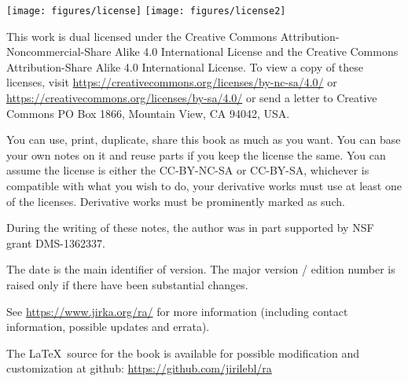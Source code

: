 \documentclass[12pt]{book}
\theoremstyle{plain}
\theoremstyle{remark}
\theoremstyle{definition}
\theoremstyle{exercise}
\theoremstyle{example}
\begin{document}
%



\bigskip

\noindent
\texttt{[image: figures/license]}
\quad
\texttt{[image: figures/license2]}

\bigskip

\noindent
This work
is dual licensed under
the Creative Commons
Attribution-Non\-commercial-Share Alike 4.0 International License and
the Creative Commons
Attribution-Share Alike 4.0 International License.
To view a
copy of these licenses, visit
\url{https://creativecommons.org/licenses/by-nc-sa/4.0/}
or
\url{https://creativecommons.org/licenses/by-sa/4.0/}
or send a letter to
Creative Commons
PO Box 1866, Mountain View, CA 94042, USA\@.

\bigskip

\noindent
You can use, print, duplicate, share this book as much as you want.  You can
base your own notes on it and reuse parts if you keep the license the
same.  You can assume the license is either the CC-BY-NC-SA or CC-BY-SA\@,
whichever is compatible with what you wish to do, your derivative works must
use at least one of the licenses.
Derivative works must be prominently marked as such.

\bigskip

\noindent
During the writing of these notes, 
the author was in part supported by NSF grant DMS-1362337.

\bigskip

\noindent
The date is the main identifier of version.  The major version / edition
number is raised only if there have been substantial changes.

\bigskip

\noindent
See \url{https://www.jirka.org/ra/} for more information
(including contact information, possible updates and errata).

\bigskip

\noindent
The \LaTeX\ source for the book is available
for possible modification and customization
at github: \url{https://github.com/jirilebl/ra}
\end{document}

